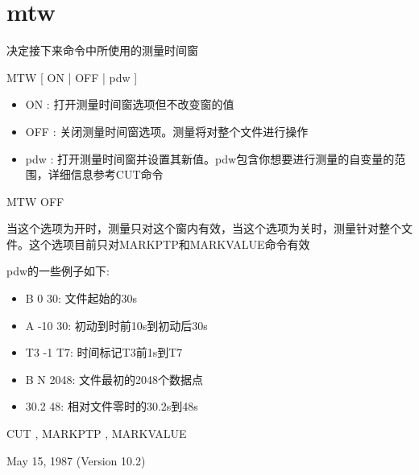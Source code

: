 \section{mtw}
\label{cmd:mtw}

决定接下来命令中所使用的测量时间窗

MTW [ ON | OFF | pdw ]

\begin{itemize}
\item ON : 打开测量时间窗选项但不改变窗的值 
\item OFF : 关闭测量时间窗选项。测量将对整个文件进行操作 
\item pdw : 打开测量时间窗并设置其新值。pdw包含你想要进行测量的自变量的范围，详细信息参考CUT命令 
\end{itemize}

MTW OFF

当这个选项为开时，测量只对这个窗内有效，当这个选项为关时，测量针对整个文件。这个选项目前只对MARKPTP和MARKVALUE命令有效

pdw的一些例子如下:
\begin{itemize}
\item B 0 30: 文件起始的30s
\item A -10 30: 初动到时前10s到初动后30s
\item T3 -1 T7: 时间标记T3前1s到T7
\item B N 2048: 文件最初的2048个数据点
\item 30.2 48: 相对文件零时的30.2s到48s
\end{itemize}

CUT , MARKPTP , MARKVALUE

May 15, 1987 (Version 10.2)
